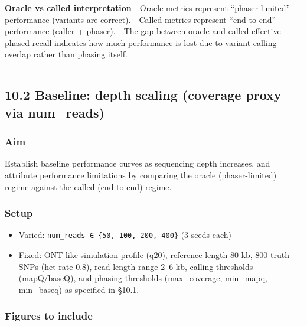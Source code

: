 \documentclass[
]{article}
\providecommand{\tightlist}{%
  \setlength{\itemsep}{0pt}\setlength{\parskip}{0pt}}
\begin{document}
\textbf{Oracle vs called interpretation} - Oracle metrics represent
``phaser-limited'' performance (variants are correct). - Called metrics
represent ``end-to-end'' performance (caller + phaser). - The gap
between oracle and called effective phased recall indicates how much
performance is lost due to variant calling overlap rather than phasing
itself.

\begin{center}\rule{0.5\linewidth}{0.5pt}\end{center}

\subsection{10.2 Baseline: depth scaling (coverage proxy via
num\_reads)}\label{baseline-depth-scaling-coverage-proxy-via-num_reads}

\subsubsection{Aim}\label{aim}

Establish baseline performance curves as sequencing depth increases, and
attribute performance limitations by comparing the oracle
(phaser-limited) regime against the called (end-to-end) regime.

\subsubsection{Setup}\label{setup}

\begin{itemize}
\tightlist
\item
  Varied: \texttt{num\_reads\ ∈\ \{50,\ 100,\ 200,\ 400\}} (3 seeds
  each)
\item
  Fixed: ONT-like simulation profile (q20), reference length 80 kb, 800
  truth SNPs (het rate 0.8), read length range 2--6 kb, calling
  thresholds (mapQ/baseQ), and phasing thresholds (max\_coverage,
  min\_mapq, min\_baseq) as specified in §10.1.
\end{itemize}

\subsubsection{Figures to include}\label{figures-to-include}
\end{document}
